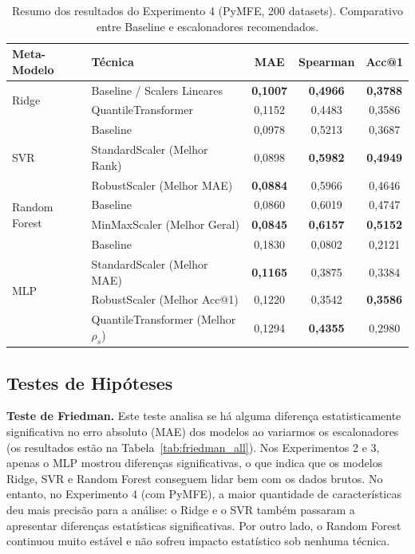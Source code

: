 \documentclass[12pt]{article}
\begin{document}
\begin{table}[ht]
\centering
\caption{Resumo dos resultados do Experimento 4 (PyMFE, 200 datasets). Comparativo entre Baseline e escalonadores recomendados.}
\label{tab:results_exp4_summary}
\small
\begin{tabular}{llccc}
\toprule
\textbf{Meta-Modelo} & \textbf{Técnica} & \textbf{MAE} & \textbf{Spearman} & \textbf{Acc@1} \\
\midrule
\multirow{2}{*}{Ridge}
 & Baseline / Scalers Lineares & \textbf{0,1007} & \textbf{0,4966} & \textbf{0,3788} \\
 & QuantileTransformer         & 0,1152          & 0,4483          & 0,3586          \\
\midrule
\multirow{3}{*}{SVR}
 & Baseline                    & 0,0978          & 0,5213          & 0,3687          \\
 & StandardScaler (Melhor Rank)& 0,0898          & \textbf{0,5982} & \textbf{0,4949} \\
 & RobustScaler (Melhor MAE)   & \textbf{0,0884} & 0,5966          & 0,4646          \\
\midrule
\multirow{2}{*}{Random Forest}
 & Baseline                    & 0,0860          & 0,6019          & 0,4747          \\
 & MinMaxScaler (Melhor Geral) & \textbf{0,0845} & \textbf{0,6157} & \textbf{0,5152} \\
\midrule
\multirow{4}{*}{MLP}
 & Baseline                    & 0,1830          & 0,0802          & 0,2121          \\
 & StandardScaler (Melhor MAE) & \textbf{0,1165} & 0,3875          & 0,3384          \\
 & RobustScaler (Melhor Acc@1) & 0,1220          & 0,3542          & \textbf{0,3586} \\
 & QuantileTransformer (Melhor $\rho_s$) & 0,1294 & \textbf{0,4355} & 0,2980          \\
\bottomrule
\end{tabular}
\end{table}

\subsection{Testes de Hipóteses}

\textbf{Teste de Friedman.} Este teste analisa se há alguma diferença estatisticamente significativa no erro absoluto (MAE) dos modelos ao variarmos os escalonadores (os resultados estão na Tabela~\ref{tab:friedman_all}). Nos Experimentos 2 e 3, apenas o MLP mostrou diferenças significativas, o que indica que os modelos Ridge, SVR e Random Forest conseguem lidar bem com os dados brutos. No entanto, no Experimento 4 (com PyMFE), a maior quantidade de características deu mais precisão para a análise: o Ridge e o SVR também passaram a apresentar diferenças estatísticas significativas. Por outro lado, o Random Forest continuou muito estável e não sofreu impacto estatístico sob nenhuma técnica.
\end{document}
